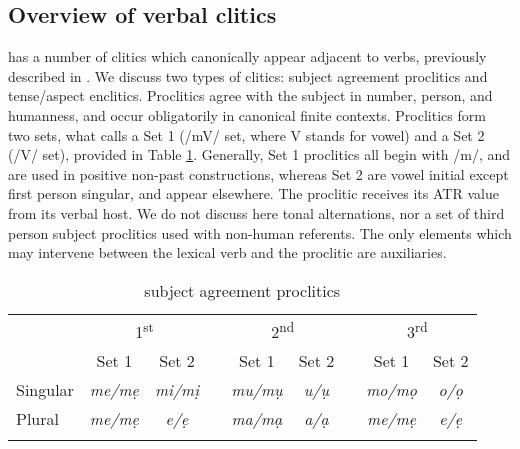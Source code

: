 \documentclass[output=paper]{langsci/langscibook}
\begin{document}
\subsection{Overview of verbal clitics}\label{sec:rolle:2.1}

 has a number of clitics which canonically appear adjacent to verbs, previously described in \citet{Kari2002a,Kari2002b,Kari2002c,Kari2002d,Kari2003b,Kari2004,Kari2005}. We discuss two types of clitics: subject agreement proclitics and tense/aspect enclitics. Proclitics agree with the subject in number, person, and humanness, and occur obligatorily in canonical finite contexts. Proclitics form two sets, what \citet[333-335]{Kari2004} calls a Set 1 (/mV/ set, where V stands for vowel) and a Set 2 (/V/ set), provided in Table \ref{bkm:Ref447870844}. Generally, Set 1 proclitics all begin with /m/, and are used in positive non-past constructions, whereas Set 2 are vowel initial except first person singular, and appear elsewhere. The proclitic receives its ATR value from its verbal host. We do not discuss here tonal alternations, nor a set of third person subject proclitics used with non-human referents. The only elements which may intervene between the lexical verb and the proclitic are auxiliaries.

\begin{table}

\begin{tabularx}{\textwidth}{Xcc c cc c cc}
\lsptoprule
    & \multicolumn{2}{c}{1\textsuperscript{st}} &&\multicolumn{2}{c}{2\textsuperscript{nd}} && \multicolumn{2}{c}{3\textsuperscript{rd}}\\
 \cmidrule{2-3}
 \cmidrule{5-6} 
 \cmidrule{8-9} 
   & {Set 1} & {Set 2} && {Set 1} & {Set 2} && {Set 1}& {Set 2} \\
    \midrule
{Singular} & {\itshape me/mẹ} & {\itshape mi/mị} && {\itshape mu/mụ} & {\itshape u/ụ} && {\itshape mo/mọ} & {\itshape o/ọ}\\
{Plural} & {\itshape me/mẹ} & {\itshape e/ẹ} && {\itshape ma/mạ} & {\itshape a/ạ} && {\itshape me/mẹ} & {\itshape e/ẹ}\\
\lspbottomrule
\end{tabularx}
\caption{ subject agreement proclitics}
\label{bkm:Ref447870844}
\end{table}
\end{document}
